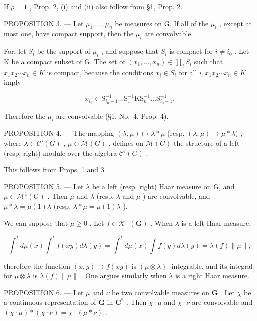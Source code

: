 If \(\rho = 1\) , Prop. 2, (i) and (ii) also follow from §1, Prop. 2.

PROPOSITION 3. --- Let \(\mu_1, \ldots, \mu_n\) be measures on G. If all of the \(\mu_i\) , except at most one, have compact support, then the \(\mu_i\) are convolvable.

For, let \(S_{i}\) be the support of \(\mu_{i}\) , and suppose that \(S_{i}\) is compact for \(i \neq i_{0}\) . Let K be a compact subset of G. The set of \((x_{1}, \ldots, x_{n}) \in \prod_{i} S_{i}\) such that \(x_{1}x_{2} \cdots x_{n} \in K\) is compact, because the conditions \(x_{i} \in S_{i}\) for all \(i, x_{1}x_{2} \cdots x_{n} \in K\) imply

\[
x _ {i _ {0}} \in \mathrm{S} _ {i _ {0} - 1} ^ {- 1} \dots \mathrm{S} _ {1} ^ {- 1} \mathrm{KS} _ {n} ^ {- 1} \dots \mathrm{S} _ {i _ {0} + 1} ^ {- 1}.
\]

Therefore the \(\mu_{i}\) are convolvable (§1, No.~4, Prop. 4).

PROPOSITION 4. --- The mapping \((\lambda, \mu) \mapsto \lambda * \mu\) (resp. \((\lambda, \mu) \mapsto \mu * \lambda)\) , where \(\lambda \in \mathcal{C}'(G)\) , \(\mu \in \mathcal{M}(G)\) , defines on \(\mathcal{M}(G)\) the structure of a left (resp. right) module over the algebra \(\mathcal{C}'(G)\) .

This follows from Props. 1 and 3.

PROPOSITION 5. --- Let \(\lambda\) be a left (resp. right) Haar measure on G, and \(\mu \in \mathcal{M}^1(\mathrm{G})\) . Then \(\mu\) and \(\lambda\) (resp. \(\lambda\) and \(\mu\) ) are convolvable, and \(\mu * \lambda = \mu(1)\lambda\) (resp. \(\lambda * \mu = \mu(1)\lambda\) ).

We can suppose that \(\mu \geqslant 0\) . Let \(f \in \mathcal{K}_{+}(\mathbf{G})\) . When \(\lambda\) is a left Haar measure,

\[
\int^ {*} d \mu (x) \int^ {*} f (x y) d \lambda (y) = \int^ {*} d \mu (x) \int f (y) d \lambda (y) = \lambda (f) \| \mu \|,
\]

therefore the function \((x,y)\mapsto f(xy)\) is \((\mu \otimes \lambda)\) -integrable, and its integral for \(\mu \otimes \lambda\) is \(\lambda (f)\| \mu \|\) . One argues similarly when \(\lambda\) is a right Haar measure.

PROPOSITION 6. --- Let \(\mu\) and \(\nu\) be two convolvable measures on \(\mathbf{G}\) . Let \(\chi\) be a continuous representation of \(\mathbf{G}\) in \(\mathbf{C}^*\) . Then \(\chi \cdot \mu\) and \(\chi \cdot \nu\) are convolvable and \((\chi \cdot \mu) * (\chi \cdot \nu) = \chi \cdot (\mu * \nu)\) .

